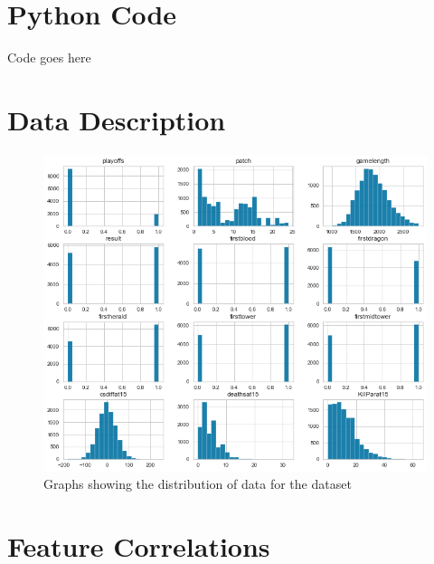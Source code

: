 
\chapter{Python Code}\label{ch:Python Code}

Code goes here

\chapter{Data Description}\label{ch:Data Description}

\begin{figure}[h!]
    \centering
    \includegraphics[width=1\textwidth]{figures/DistributionVisualisation}
    \caption{Graphs showing the distribution of data for the dataset}
    \label{fig:DistroVisual}
\end{figure}

\chapter{Feature Correlations}\label{ch:Feature Correlations}

